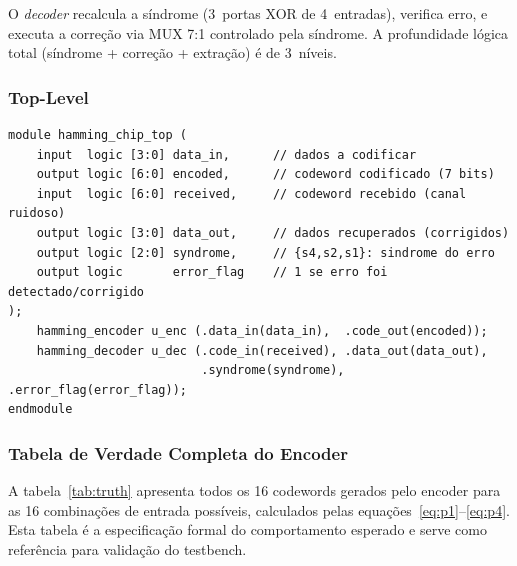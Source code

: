 \documentclass[12pt,a4paper]{article}
\begin{document}
O \textit{decoder} recalcula a síndrome (3~portas XOR de 4~entradas), verifica erro, e executa a correção via MUX 7:1 controlado pela síndrome. A profundidade lógica total (síndrome + correção + extração) é de 3~níveis.

\subsubsection{Top-Level}

\begin{lstlisting}[style=svstyle,caption={hamming\_chip\_top.sv --- Integração encoder/decoder},label=lst:top]
module hamming_chip_top (
    input  logic [3:0] data_in,      // dados a codificar
    output logic [6:0] encoded,      // codeword codificado (7 bits)
    input  logic [6:0] received,     // codeword recebido (canal ruidoso)
    output logic [3:0] data_out,     // dados recuperados (corrigidos)
    output logic [2:0] syndrome,     // {s4,s2,s1}: sindrome do erro
    output logic       error_flag    // 1 se erro foi detectado/corrigido
);
    hamming_encoder u_enc (.data_in(data_in),  .code_out(encoded));
    hamming_decoder u_dec (.code_in(received), .data_out(data_out),
                           .syndrome(syndrome), .error_flag(error_flag));
endmodule
\end{lstlisting}

\subsubsection{Tabela de Verdade Completa do Encoder}

A tabela~\ref{tab:truth} apresenta todos os 16 codewords gerados pelo encoder para as 16 combinações de entrada possíveis, calculados pelas equações~\eqref{eq:p1}--\eqref{eq:p4}. Esta tabela é a especificação formal do comportamento esperado e serve como referência para validação do testbench.
\end{document}
